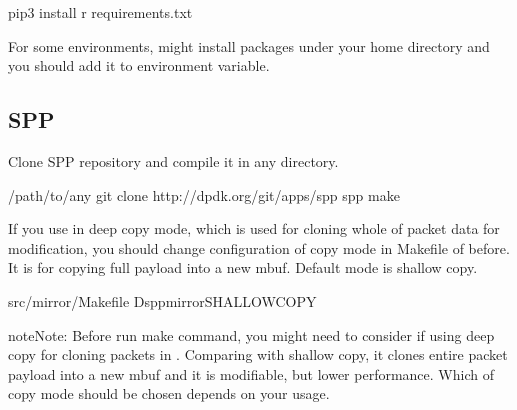 \documentclass[a4paper,11pt,openany,oneside,english]{sphinxmanual}
\begin{document}
\begin{sphinxVerbatim}[commandchars=\\\{\},formatcom=\footnotesize]
 pip3 install \PYGZhy{}r requirements.txt
\end{sphinxVerbatim}

For some environments,  might install packages under your home
directory  and you should add it to  environment
variable.


\subsection{SPP}
\label{\detokenize{gsg/install:spp}}\label{\detokenize{gsg/install:setup-install-spp}}
Clone SPP repository and compile it in any directory.

\begin{sphinxVerbatim}[commandchars=\\\{\},formatcom=\footnotesize]
  /path/to/any
 git clone http://dpdk.org/git/apps/spp
  spp
 make  
\end{sphinxVerbatim}

If you use  in deep copy mode,
which is used for cloning whole of packet data for modification,
you should change configuration of copy mode in Makefile of 
before.
It is for copying full payload into a new mbuf.
Default mode is shallow copy.

\begin{sphinxVerbatim}[commandchars=\\\{\},formatcom=\footnotesize]
 src/mirror/Makefile
  \PYGZhy{}Dspp\PYGZus{}mirror\PYGZus{}SHALLOWCOPY
\end{sphinxVerbatim}

\begin{sphinxadmonition}{note}{Note:}
Before run make command, you might need to consider if using deep copy
for cloning packets in . Comparing with shallow copy, it
clones entire packet payload into a new mbuf and it is modifiable,
but lower performance. Which of copy mode should be chosen depends on
your usage.
\end{sphinxadmonition}
\end{document}
